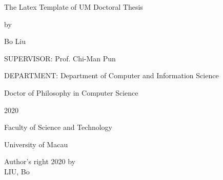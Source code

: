 \documentclass[a4paper, 12pt, twoside]{report}
\begin{document}
\begin{titlepage}
    \begin{center}
        \vspace*{1.5cm}
        \large
 
        
        The Latex Template of UM Doctoral Thesis 
        
        \vspace{1.2cm}
 
        by
 
        \vspace{1.2cm}
 
        Bo Liu
 
        \vspace{1.2cm}
 
        SUPERVISOR: Prof. Chi-Man Pun
 
        \vspace{1.2cm}
        
        DEPARTMENT: Department of Computer and Information Science
        
        \vspace{1.2cm}
 
        Doctor of Philosophy in Computer Science
        
        \vspace{1.2cm}
 
        2020
        
        \vspace{1.2cm}
        
        Faculty of Science and Technology
        
        \vspace{1.2cm}
        
        University of Macau

    \end{center}
\end{titlepage}

\begin{titlepage}
    \begin{center}
        \vspace*{6.23cm}
        \large
 
       Author's right 2020 by\\
       LIU, Bo
 

    \end{center}
\end{titlepage}

\restoregeometry
{}

\chapter*{}
\lipsum[1]
\\
\end{document}

